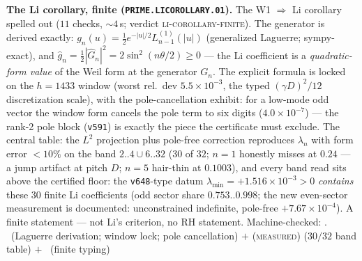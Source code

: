 \par\smallskip\noindent\textbf{The Li corollary, finite
(\texttt{PRIME.LICOROLLARY.01}).}
The W1 $\Rightarrow$ Li corollary spelled out ($11$ checks,
${\sim}4$\,s; verdict \textsc{li-corollary-finite}).  The generator
is derived exactly:
$g_n(u)=\tfrac12e^{-|u|/2}L^{(1)}_{n-1}(|u|)$ (generalized Laguerre;
sympy-exact), and
$\hat g_n=\tfrac12|\hat G_n|^2=2\sin^2(n\theta/2)\ge0$ --- the Li
coefficient is a \emph{quadratic-form value} of the Weil form at the
generator $G_n$.  The explicit formula is locked on the $h=1433$
window (worst rel.\ dev $5.5\times10^{-3}$, the typed
$(\gamma D)^2/12$ discretization scale), with the pole-cancellation
exhibit: for a low-mode odd vector the window form cancels the pole
term to six digits ($4.0\times10^{-7}$) --- the rank-2 pole block
(\texttt{v591}) is exactly the piece the certificate must exclude.
The central table: the $L^2$ projection plus pole-free correction
reproduces $\lambda_n$ with form error $<10\%$ on the band
$2..4\cup6..32$ ($30$ of $32$; $n=1$ honestly misses at $0.24$ ---
a jump artifact at pitch $D$; $n=5$ hair-thin at $0.1003$), and
every band read sits above the certified floor: the
\texttt{v648}-type datum $\lambda_{\min}=+1.516\times10^{-3}>0$
\emph{contains} these $30$ finite Li coefficients (odd sector share
$0.753..0.998$; the new even-sector measurement is documented:
unconstrained indefinite, pole-free $+7.67\times10^{-4}$).  A finite
statement --- not Li's criterion, no RH statement.
Machine-checked: .
\mE\ (Laguerre derivation; window lock; pole cancellation) $+$
(\textsc{measured}) ($30/32$ band table) $+$ \mC\ (finite typing)
\par\smallskip


